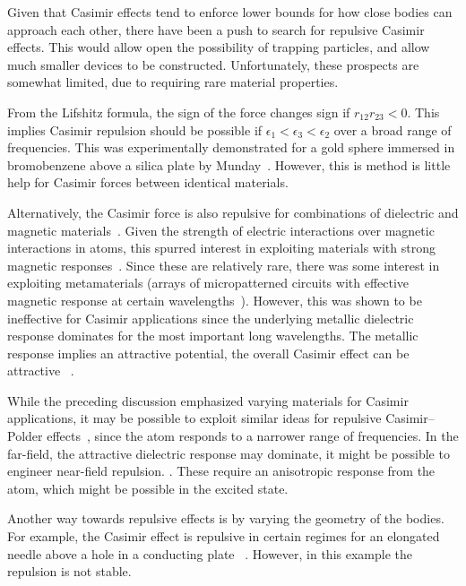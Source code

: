 Given that Casimir effects tend to enforce lower bounds for how close bodies can approach each other,
there have been a push to search for repulsive Casimir effects.  This would allow open the possibility
of trapping particles, and allow much smaller devices to be constructed.  
Unfortunately, these prospects are somewhat limited, due to requiring rare material properties.

From the Lifshitz formula, the sign of the force changes sign if $r_{12}r_{23}<0$.
This implies Casimir repulsion should be possible if $\epsilon_1<\epsilon_3<\epsilon_2$ over a broad range of frequencies.
This was experimentally demonstrated for a gold sphere immersed in bromobenzene above a silica plate
by Munday~\etal\cite{Munday2009}.  However, this is method is little help for Casimir forces between
identical materials.  

Alternatively, the Casimir force is also repulsive for combinations of dielectric and magnetic materials~\cite{Boyer1974}.  
Given the strength of electric interactions over magnetic interactions in atoms, this spurred interest
in exploiting materials with strong magnetic responses~\cite{Kenneth2002}.  
Since these are relatively rare, there was some interest in exploiting metamaterials (arrays of micropatterned circuits with
effective magnetic response at certain wavelengths~\cite{Pendry1999}).  However, this was shown to be ineffective
for Casimir applications since the underlying metallic dielectric response dominates for the most important long wavelengths.
The metallic response implies an attractive potential, the overall Casimir effect can be attractive~
\cite{Ianuzzi2003comment,Rosa2008,Pirozhenko2008,Yannopapas2009}.  

While the preceding discussion emphasized varying materials for Casimir applications, it may 
be possible to exploit similar ideas for repulsive Casimir--Polder effects~\cite{Milton2011,Milton2012},
since the atom responds to a narrower range of frequencies.  In the far-field, the attractive dielectric
response may dominate, it might be possible to engineer near-field repulsion.  .
These require an anisotropic response from the atom, which might be possible in the excited state.

Another way towards repulsive effects is by varying the geometry of the bodies.  
For example, the Casimir effect is repulsive in certain regimes for an elongated needle above a hole in a conducting plate~
\cite{Levin2010}.  However, in this example the repulsion is not stable. 



